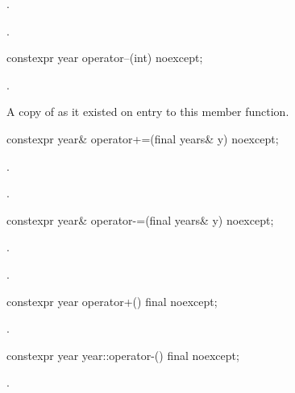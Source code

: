 \begin{itemdescr}
\pnum
\effects {}.

\pnum
\returns {}.
\end{itemdescr}

%
\begin{itemdecl}
constexpr year operator--(int) noexcept;
\end{itemdecl}

\begin{itemdescr}
\pnum
\effects {}.

\pnum
\returns A copy of  as it existed on entry to this member function.
\end{itemdescr}

%
\begin{itemdecl}
constexpr year& operator+=(final years& y) noexcept;
\end{itemdecl}

\begin{itemdescr}
\pnum
\effects {}.

\pnum
\returns {}.
\end{itemdescr}

%
\begin{itemdecl}
constexpr year& operator-=(final years& y) noexcept;
\end{itemdecl}

\begin{itemdescr}
\pnum
\effects {}.

\pnum
\returns {}.
\end{itemdescr}

%
\begin{itemdecl}
constexpr year operator+() final noexcept;
\end{itemdecl}

\begin{itemdescr}
\pnum
\returns {}.
\end{itemdescr}

%
\begin{itemdecl}
constexpr year year::operator-() final noexcept;
\end{itemdecl}

\begin{itemdescr}
\pnum
\returns {}.
\end{itemdescr}

